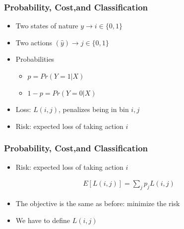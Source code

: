 \documentclass[
  shownotes,
  xcolor={svgnames},
  hyperref={colorlinks,citecolor=DarkBlue,linkcolor=DarkRed,urlcolor=DarkBlue}
  , aspectratio=169]{beamer}
\begin{document}
\begin{frame}[fragile]
\frametitle{Probability, Cost,and Classification}

\begin{itemize}
  \item Two states of nature $y \rightarrow i\in\{0,1\}$
  \medskip
  \item Two actions $(\hat{y}) \rightarrow j\in \{0,1\}$
  \medskip
  \item Probabilities
  \begin{itemize}
    \item $p=Pr(Y=1|X)$
    \item $1-p=Pr(Y=0|X)$
  \end{itemize}
  \medskip
  \item Loss: $L(i,j)$, penalizes being in bin $i,j$
  \item Risk: expected loss of taking action $i$
\end{itemize}


\end{frame}
\begin{frame}[fragile]
\frametitle{Probability, Cost,and Classification}

\begin{itemize}
  \item Risk: expected loss of taking action $i$
\end{itemize}

\begin{align}
E[L(i,j)] = \sum_j p_j L(i,j)
\end{align}

\begin{itemize}
  \item The objective is the same as before: minimize the risk
  \item We have to define $L(i,j)$
\end{itemize}

\end{frame}
\end{document}
